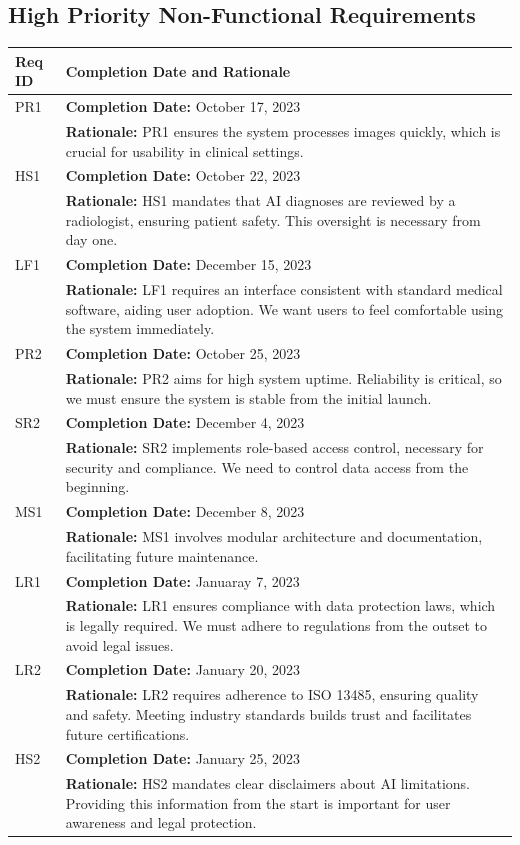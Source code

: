 \documentclass[12pt]{article}
\begin{document}
\subsection{High Priority Non-Functional Requirements}
\begin{table}[H]
  \label{TblHighPriorityNFRs}
  \begin{tabular}{p{}|p{}}
  \toprule
  \textbf{Req ID} & \textbf{Completion Date and Rationale} \\
  \midrule
  PR1 & \textbf{Completion Date:} October 17, 2023\\
      & \textbf{Rationale:} PR1 ensures the system processes images quickly, which is crucial for usability in clinical settings. \\
  \midrule
  HS1 & \textbf{Completion Date:} October 22, 2023\\
      & \textbf{Rationale:} HS1 mandates that AI diagnoses are reviewed by a radiologist, ensuring patient safety. This oversight is necessary from day one. \\
  \midrule
  LF1 & \textbf{Completion Date:} December 15, 2023\\
      & \textbf{Rationale:} LF1 requires an interface consistent with standard medical software, aiding user adoption. We want users to feel comfortable using the system immediately. \\
  \midrule
  PR2 & \textbf{Completion Date:} October 25, 2023\\
      & \textbf{Rationale:} PR2 aims for high system uptime. Reliability is critical, so we must ensure the system is stable from the initial launch. \\
  \midrule
  SR2 & \textbf{Completion Date:} December 4, 2023\\
      & \textbf{Rationale:} SR2 implements role-based access control, necessary for security and compliance. We need to control data access from the beginning. \\
  \midrule
  MS1 & \textbf{Completion Date:} December 8, 2023\\
      & \textbf{Rationale:} MS1 involves modular architecture and documentation, facilitating future maintenance. \\
  \midrule
  LR1 & \textbf{Completion Date:} Januaray 7, 2023\\
      & \textbf{Rationale:} LR1 ensures compliance with data protection laws, which is legally required. We must adhere to regulations from the outset to avoid legal issues. \\
  \midrule
  LR2 & \textbf{Completion Date:} January 20, 2023\\
      & \textbf{Rationale:} LR2 requires adherence to ISO 13485, ensuring quality and safety. Meeting industry standards builds trust and facilitates future certifications. \\
  \midrule
  HS2 & \textbf{Completion Date:} January 25, 2023\\
      & \textbf{Rationale:} HS2 mandates clear disclaimers about AI limitations. Providing this information from the start is important for user awareness and legal protection. \\
  \bottomrule
  \end{tabular}
  \end{table}
\end{document}
